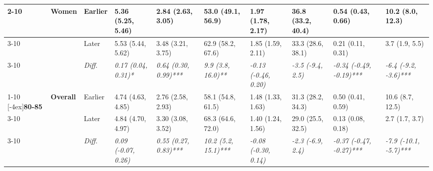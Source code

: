 \documentclass[12pt, a4paper]{article}
\begin{document}
\begin{appendices}
\begin{table}[!p]
{\begin{tabular}[t]{>{}l>{}lllllllll}
        \cmidrule{2-10}
                                              & \multirow{3}{*}{\textbf{Women}}   & Earlier                       & 5.36 (5.25, 5.46)                           & 2.84 (2.63, 3.05)                            & 53.0 (49.1, 56.9)                           & 1.97 (1.78, 2.17)                           & 36.8 (33.2, 40.4)                          & 0.54 (0.43, 0.66)                               & 10.2 (8.0, 12.3)                              \\
        \cmidrule{3-10}
                                              &                                   & Later                         & 5.53 (5.44, 5.62)                           & 3.48 (3.21, 3.75)                            & 62.9 (58.2, 67.6)                           & 1.85 (1.59, 2.11)                           & 33.3 (28.6, 38.1)                          & 0.21 (0.11, 0.31)                               & 3.7 (1.9, 5.5)                                \\
        \cmidrule{3-10}
                                              &                                   & \cellcolor{gray!10}\em{Diff.} & \cellcolor{gray!10}\em{0.17 (0.04, 0.31)*}  & \cellcolor{gray!10}\em{0.64 (0.30, 0.99)***} & \cellcolor{gray!10}\em{9.9 (3.8, 16.0)**}   & \cellcolor{gray!10}\em{-0.13 (-0.46, 0.20)} & \cellcolor{gray!10}\em{-3.5 (-9.4, 2.5)}   & \cellcolor{gray!10}\em{-0.34 (-0.49, -0.19)***} & \cellcolor{gray!10}\em{-6.4 (-9.2, -3.6)***}  \\
        \cmidrule{1-10}
        \multirow{9}{*}[-4ex]{\textbf{80-85}} & \multirow{3}{*}{\textbf{Overall}} & Earlier                       & 4.74 (4.63, 4.85)                           & 2.76 (2.58, 2.93)                            & 58.1 (54.8, 61.5)                           & 1.48 (1.33, 1.63)                           & 31.3 (28.2, 34.3)                          & 0.50 (0.41, 0.59)                               & 10.6 (8.7, 12.5)                              \\
        \cmidrule{3-10}
                                              &                                   & Later                         & 4.84 (4.70, 4.97)                           & 3.30 (3.08, 3.52)                            & 68.3 (64.6, 72.0)                           & 1.40 (1.24, 1.56)                           & 29.0 (25.5, 32.5)                          & 0.13 (0.08, 0.18)                               & 2.7 (1.7, 3.7)                                \\
        \cmidrule{3-10}
                                              &                                   & \cellcolor{gray!10}\em{Diff.} & \cellcolor{gray!10}\em{0.09 (-0.07, 0.26)}  & \cellcolor{gray!10}\em{0.55 (0.27, 0.83)***} & \cellcolor{gray!10}\em{10.2 (5.2, 15.1)***} & \cellcolor{gray!10}\em{-0.08 (-0.30, 0.14)} & \cellcolor{gray!10}\em{-2.3 (-6.9, 2.4)}   & \cellcolor{gray!10}\em{-0.37 (-0.47, -0.27)***} & \cellcolor{gray!10}\em{-7.9 (-10.1, -5.7)***} \\

\end{tabular}}
\end{table}
\end{appendices}
\end{document}

